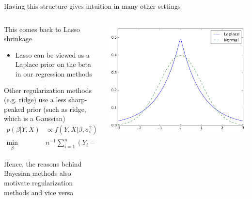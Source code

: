 \documentclass[notes,11pt, aspectratio=169]{beamer}
\newenvironment{wideitemize}{\itemize\addtolength{\itemsep}{10pt}}{\enditemize}
\begin{document}
\begin{frame}{Having this structure gives intuition in many other settings}
  \begin{columns}[T] %
    \begin{column}{.5\textwidth}
  \begin{wideitemize}
  \item This comes back to Lasso shrinkage
    \begin{itemize}
    \item Lasso can be viewed as a Laplace prior on the beta in our regression methods
    \end{itemize}
  \item Other regularization methods (e.g. ridge) use a less
    sharp-peaked prior (such as ridge, which is a Gaussian)
    \begin{align*}
      p(\beta | Y, X) &\propto f(Y,X | \beta, \sigma^{2}_{\epsilon}) p(\beta)\\
      \min_{\beta} \;& n^{-1}\sum_{i=1}^{n}(Y_{i} - X_{i}\beta)^{2} + \lambda \sum_{k=1}^{p}|\beta_{k}|
    \end{align*}
  \item Hence, the reasons behind Bayesian methods also motivate
    regularization methods and vice versa
  \end{wideitemize}
\end{column}
\begin{column}{0.5\textwidth}
  \includegraphics[width=\linewidth]{images/normal_laplace.png}
\end{column}
\end{columns}
  
\end{frame}
\end{document}
